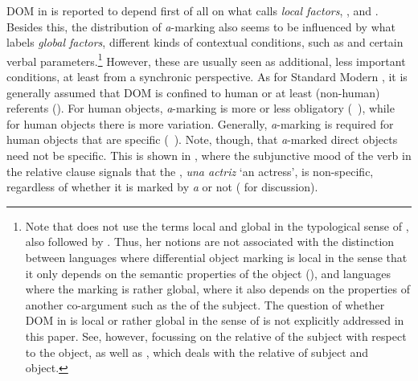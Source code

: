 \documentclass[output=paper]{LSP/langsci}
\begin{document}
DOM in  is reported to depend first of all on what \citet{Laca2002Gramaticalizacion,Laca2006Objeto} calls \textit{local factors}, \ie {},  and . Besides this, the distribution of \textit{a}-marking also seems to be influenced by what \citet[429--432; 454--462]{Laca2006Objeto} labels \textit{global factors}, \ie different kinds of contextual conditions, such as  and certain verbal parameters.\footnote{Note that \citet{Laca2006Objeto} does not use the terms local and global in the typological sense of \citet{Silverstein1976Hierarchy}, also followed by . Thus, her notions are not associated with the distinction between languages where differential object marking is local in the sense that it only depends on the semantic properties of the object (\eg {}), and languages where the marking is rather global, \ie where it also depends on the properties of another co-argument such as the  of the subject. The question of whether DOM in  is local or rather global in the sense of \citet{Silverstein1976Hierarchy} is not explicitly addressed in this paper. See, however,  focussing on the relative  of the subject with respect to the object, as well as \citet[40--43, 76--81]{GarciaGarcia2014Objektmarkierung}, which deals with the relative  of subject and object.} However, these are usually seen as additional, \ie less important conditions, at least from a synchronic perspective. As for Standard Modern , it is generally assumed that DOM is confined to human or at least  (non-human) referents (\cf \eg \citealt[1782]{Torrego1999Gramatica}). For  human objects, \textit{a}-marking is more or less obligatory (\cf~), while for  human objects there is more variation. Generally, \textit{a}-marking is required for  human objects that are specific (\cf~). Note, though, that \textit{a}-marked direct objects need not be specific. This is shown in , where the subjunctive mood of the verb in the relative clause signals that the , \ie \textit{una actriz} ‘an actress’, is non-specific, regardless of whether it is marked by \textit{a} or not (\cf \citealt[82--86]{Leonetti2004Specificity} for discussion). 
\end{document}
